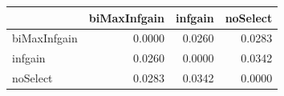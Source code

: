 \begin{tabular}{lrrr}
\toprule
 & biMaxInfgain & infgain & noSelect \\
\midrule
biMaxInfgain & 0.0000 & 0.0260 & 0.0283 \\
infgain & 0.0260 & 0.0000 & 0.0342 \\
noSelect & 0.0283 & 0.0342 & 0.0000 \\
\bottomrule
\end{tabular}
